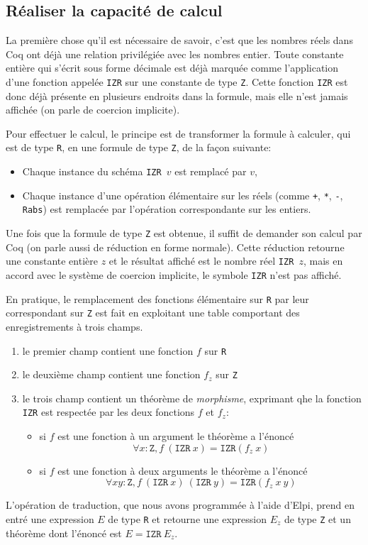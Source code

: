 \documentclass[draft]{jflart}
\begin{document}
\subsection{Réaliser la capacité de calcul}
La première chose qu'il est nécessaire de savoir, c'est que les
nombres réels dans Coq ont déjà une relation privilégiée avec les
nombres entier.  Toute constante entière qui s'écrit sous forme
décimale est déjà marquée comme l'application d'une fonction appelée
\texttt{IZR} sur une constante de type \texttt{Z}.  Cette fonction \texttt{IZR}
est donc déjà présente en plusieurs endroits dans la formule, mais
elle n'est jamais affichée (on parle de coercion implicite).

Pour effectuer le calcul, le principe est de transformer la formule à
calculer, qui est de type \texttt{R}, en une formule de type \texttt{Z},
 de la façon suivante:
\begin{itemize}
\item Chaque instance du schéma \texttt{IZR \(v\)} est remplacé par \(v\),
\item Chaque instance d'une opération élémentaire sur les
réels (comme \texttt{+}, \texttt{*}, \texttt{-}, \texttt{Rabs}) est remplacée par
l'opération correspondante sur les entiers.
\end{itemize}
Une fois que la formule de type \texttt{Z} est obtenue, il suffit de demander
son calcul par Coq (on parle aussi de réduction en forme normale).
Cette réduction retourne une constante entière \(z\) et le résultat
affiché est le nombre réel \texttt{IZR \(z\)}, mais en accord avec le
système de coercion implicite, le symbole \texttt{IZR} n'est pas affiché.

En pratique, le remplacement des fonctions élémentaire sur \texttt{R} par
leur correspondant sur \texttt{Z} est fait en exploitant une table
comportant des enregistrements à trois champs.

\begin{enumerate}
\item le premier champ contient une fonction \(f\) sur \texttt{R}
\item le deuxième champ contient une fonction \(f_z\) sur \texttt{Z}
\item le trois champ contient un théorème de {\em morphisme},
  exprimant qhe la fonction \texttt{IZR} est respectée par les deux
  fonctions \(f\) et \(f_z\):
\begin{itemize}
\item si \(f\) est une fonction à un argument le théorème a l'énoncé
\[\forall x : \texttt{Z}, f~(\texttt{IZR}~x)=\texttt{IZR}(f_z~x)\]
\item si \(f\) est une fonction à deux arguments le théorème a l'énoncé
\[\forall x y : \texttt{Z}, f~(\texttt{IZR}~x)~(\texttt{IZR}~y)=\texttt{IZR}(f_z~x~y)\]
\end{itemize}
\end{enumerate}
L'opération de traduction, que nous avons programmée à l'aide d'Elpi,
prend en entré une expression \(E\) de type \texttt{R} et retourne une
expression \(E_z\) de type \texttt{Z} et un théorème dont l'énoncé est
\(E = \texttt{IZR}~E_z\).
\end{document}
